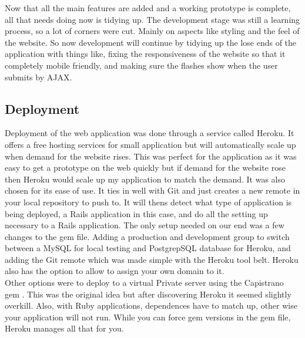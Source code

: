 Now that all the main features are added and a working prototype is complete, all that needs doing now is tidying up. The development stage was still a learning process, so a lot of corners were cut. Mainly on aspects like styling and the feel of the website. So now development will continue by tidying up the lose ends of the application with things like, fixing the responsiveness of the website so that it completely mobile friendly, and making sure the flashes show when the user submits by AJAX.\\

\subsection{Deployment}
\label{sec:deployment}
Deployment of the web application was done through a service called Heroku. It offers a free hosting services for small application but will automatically scale up when demand for the website rises. This was perfect for the application as it was easy to get a prototype on the web quickly but if demand for the website rose then Heroku would scale up my application to match the demand. It was also chosen for its ease of use. It ties in well with Git and just creates a new remote in your local repository to push to. It will thens detect what type of application is being deployed, a Rails application in this case, and do all the setting up necessary to a Rails application. The only setup needed on our end was a few changes to the gem file. Adding a production and development group to switch between a MySQL \citep{mysql:1995} for local testing and PostgrepSQL \citep{postgres:1995} database for Heroku, and adding the Git remote which was made simple with the Heroku tool belt. Heroku also has the option to allow to assign your own domain to it.\\

Other options were to deploy to a virtual Private server using the Capistrano gem \citep{capistrano:2013}. This was the original idea but after discovering Heroku it seemed slightly overkill. Also, with Ruby applications, dependences have to match up, other wise your application will not run. While you can force gem versions in the gem file, Heroku manages all that for you.
